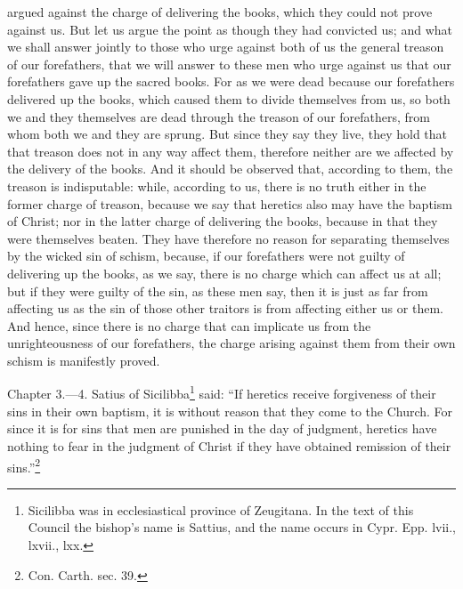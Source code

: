 argued against the charge of delivering the books, which they could not prove against us. But let us argue the point as though they had convicted us; and what we shall answer jointly to those who urge against both of us the general treason of our forefathers, that we will answer to these men who urge against us that our forefathers gave up the sacred books. For as we were dead because our forefathers delivered up the books, which caused them to divide themselves from us, so both we and they themselves are dead through the treason of our forefathers, from whom both we and they are sprung. But since they say they live, they hold that that treason does not in any way affect them, therefore neither are we affected by the delivery of the books. And it should be observed that, according to them, the treason is indisputable: while, according to us, there is no truth either in the former charge of treason, because we say that heretics also may have the baptism of Christ; nor in the latter charge of delivering the books, because in that they were themselves beaten. They have therefore no reason for separating themselves by the wicked sin of schism, because, if our forefathers were not guilty of delivering up the books, as we say, there is no charge which can affect us at all; but if they were guilty of the sin, as these men say, then it is just as far from affecting us as the sin of those other traitors is from affecting either us or them. And hence, since there is no charge that can implicate us from the unrighteousness of our forefathers, the charge arising against them from their own schism is manifestly proved.


Chapter 3.—4. Satius of Sicilibba\footnote{\par  Sicilibba was in ecclesiastical province of Zeugitana. In the text of this Council the bishop’s name is Sattius, and the name occurs in Cypr. Epp. lvii., lxvii., lxx.} said: ``If heretics receive forgiveness of their sins in their own baptism, it is without reason that they come to the Church. For since it is for sins that men are punished in the day of judgment, heretics have nothing to fear in the judgment of Christ if they have obtained remission of their sins.''\footnote{\par  Con. Carth. sec. 39.}

